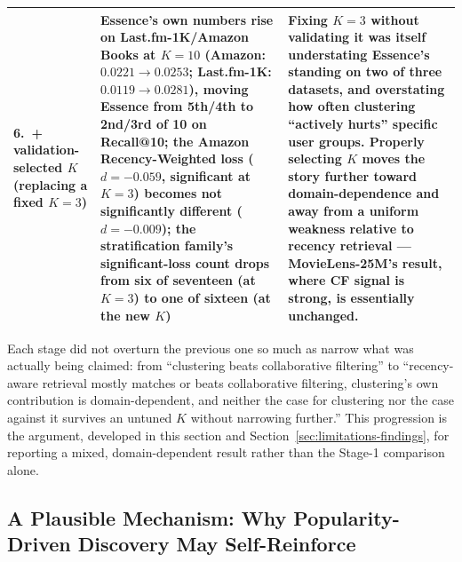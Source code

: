 \documentclass[11pt,a4paper]{article}
\begin{document}
\begin{table}[htbp]
\begin{tabular}{p{2.5cm}p{4.7cm}p{6.3cm}}
\midrule
6.\ + validation-selected $K$ (replacing a fixed $K=3$) & Essence's own numbers rise on Last.fm-1K/Amazon Books at $K=10$ (Amazon: $0.0221\to0.0253$; Last.fm-1K: $0.0119\to0.0281$), moving Essence from 5th/4th to 2nd/3rd of 10 on Recall@10; the Amazon Recency-Weighted loss ($d=-0.059$, significant at $K=3$) becomes not significantly different ($d=-0.009$); the stratification family's significant-loss count drops from six of seventeen (at $K=3$) to one of sixteen (at the new $K$) & Fixing $K=3$ without validating it was itself understating Essence's standing on two of three datasets, and overstating how often clustering ``actively hurts'' specific user groups. Properly selecting $K$ moves the story further toward domain-dependence and away from a uniform weakness relative to recency retrieval --- MovieLens-25M's result, where CF signal is strong, is essentially unchanged. \\
\bottomrule
\end{tabular}
\end{table}

Each stage did not overturn the previous one so much as narrow what was
actually being claimed: from ``clustering beats collaborative filtering''
to ``recency-aware retrieval mostly matches or beats collaborative
filtering, clustering's own contribution is domain-dependent, and neither
the case for clustering nor the case against it survives an untuned $K$
without narrowing further.'' This progression is
the argument, developed in this section and Section~\ref{sec:limitations-findings},
for reporting a mixed, domain-dependent result rather than the Stage-1
comparison alone.

\subsection{A Plausible Mechanism: Why Popularity-Driven Discovery May Self-Reinforce}
\end{document}
